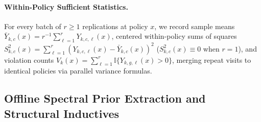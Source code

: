 \paragraph{Within-Policy Sufficient Statistics.}
For every batch of $r \ge 1$ replications at policy $x$, we record sample means $\bar{Y}_{k,c}(x) = r^{-1}\sum_{\ell=1}^r Y_{k,c,\ell}(x)$, centered within-policy sums of squares $S_{k,c}^2(x) = \sum_{\ell=1}^r (Y_{k,c,\ell}(x) - \bar{Y}_{k,c}(x))^2$ ($S_{k,c}^2(x) \equiv 0$ when $r = 1$), and violation counts $V_k(x) = \sum_{\ell=1}^r \mathbb{I}\{Y_{k,g,\ell}(x) > 0\}$, merging repeat visits to identical policies via parallel variance formulas.

\subsection{Offline Spectral Prior Extraction and Structural Inductives}

